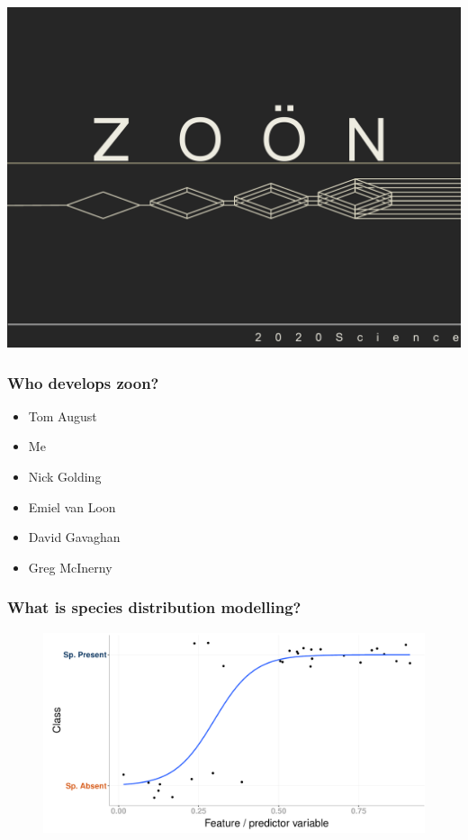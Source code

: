 \documentclass{beamer}
\newlength\beamerleftmargin
\begin{document}
\begin{frame}[plain]
    \hspace*{-\beamerleftmargin}%
    \includegraphics[width=\paperwidth,width=\paperwidth]{zoonSlide}
\end{frame} 



\begin{frame}
\frametitle{Who develops zoon?}
\begin{itemize}
\item Tom August
\item Me
\item Nick Golding
\item Emiel van Loon
\item David Gavaghan
\item Greg McInerny
\end{itemize}
\end{frame} 

\begin{frame}
\frametitle{What is species distribution modelling?}
\begin{figure}
    \includegraphics[height = 0.6\textheight]{classification2}
\end{figure} 
\end{frame} 
\end{document}
